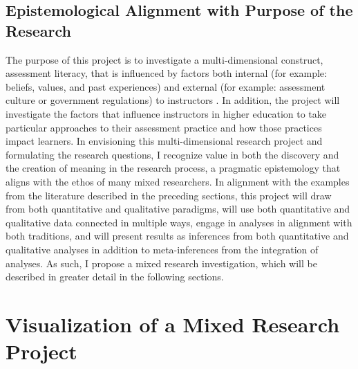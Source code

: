 \documentclass[
]{book}
\begin{document}
\hypertarget{epistemological-alignment-with-purpose-of-the-research}{%
\subsection*{Epistemological Alignment with Purpose of the Research}\label{epistemological-alignment-with-purpose-of-the-research}}

The purpose of this project is to investigate a multi-dimensional construct, assessment literacy, that is influenced by factors both internal (for example: beliefs, values, and past experiences) and external (for example: assessment culture \citep{delucaExploringAssessmentCultures2021, masseyAssessmentLiteracyCollege2020} or government regulations) to instructors \citep{delucaDifferentialSituatedView2019}. In addition, the project will investigate the factors that influence instructors in higher education to take particular approaches to their assessment practice and how those practices impact learners. In envisioning this multi-dimensional research project and formulating the research questions, I recognize value in both the discovery and the creation of meaning in the research process, a pragmatic epistemology that aligns with the ethos of many mixed researchers. In alignment with the examples from the literature described in the preceding sections, this project will draw from both quantitative and qualitative paradigms, will use both quantitative and qualitative data connected in multiple ways, engage in analyses in alignment with both traditions, and will present results as inferences from both quantitative and qualitative analyses in addition to meta-inferences \citep[p.~62]{bazeleyIntegratingAnalysesMixed2018} from the integration of analyses. As such, I propose a mixed research investigation, which will be described in greater detail in the following sections.

\hypertarget{visualization-of-a-mixed-research-project}{%
\section*{Visualization of a Mixed Research Project}\label{visualization-of-a-mixed-research-project}}
\end{document}
